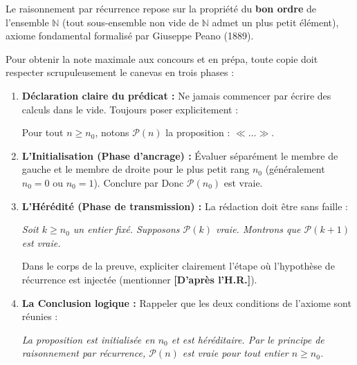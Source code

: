 \documentclass[11pt,a4paper]{article}
\newcommand{\N}{\mathbb{N}}
\begin{document}
\begin{tcolorbox}[enhanced, colback=white, colframe=primary, arc=2mm, boxrule=1pt, title={\textsc{Fiche Méthode MPSI : Les Trois Piliers du Raisonnement par Récurrence}}]
\small
Le raisonnement par récurrence repose sur la propriété du \textbf{bon ordre} de l'ensemble $\N$ (tout sous-ensemble non vide de $\N$ admet un plus petit élément), axiome fondamental formalisé par Giuseppe Peano (1889).

Pour obtenir la note maximale aux concours et en prépa, toute copie doit respecter scrupuleusement le canevas en trois phases :

\begin{enumerate}[leftmargin=*]
    \item \textbf{Déclaration claire du prédicat :}
    Ne jamais commencer par écrire des calculs dans le vide. Toujours poser explicitement :
    \begin{center}
    \og Pour tout $n \ge n_0$, notons $\mathcal{P}(n)$ la proposition : $\ll \dots \gg$. \fg
    \end{center}

    \item \textbf{L'Initialisation (Phase d'ancrage) :}
    Évaluer séparément le membre de gauche et le membre de droite pour le plus petit rang $n_0$ (généralement $n_0 = 0$ ou $n_0 = 1$). Conclure par \og Donc $\mathcal{P}(n_0)$ est vraie. \fg

    \item \textbf{L'Hérédité (Phase de transmission) :}
    La rédaction doit être sans faille :
    \begin{center}
    \og \emph{Soit $k \ge n_0$ un entier fixé. Supposons $\mathcal{P}(k)$ vraie. Montrons que $\mathcal{P}(k+1)$ est vraie.} \fg
    \end{center}
    Dans le corps de la preuve, expliciter clairement l'étape où l'hypothèse de récurrence est injectée (mentionner \textbf{[D'après l'H.R.]}).

    \item \textbf{La Conclusion logique :}
    Rappeler que les deux conditions de l'axiome sont réunies :
    \begin{center}
    \og \emph{La proposition est initialisée en $n_0$ et est héréditaire. Par le principe de raisonnement par récurrence, $\mathcal{P}(n)$ est vraie pour tout entier $n \ge n_0$.} \fg
    \end{center}
\end{enumerate}
\end{tcolorbox}
\end{document}
